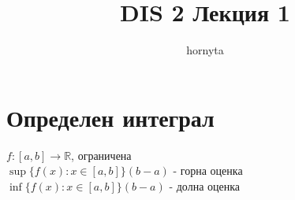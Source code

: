 \documentclass{article}
\author{hornyta}
\title{DIS 2 Лекция 1}
\begin{document}
\maketitle

\section{Определен интеграл}
\begin{figure*}[h!]
    
    

    \(f:[a,b] \to \mathbb{R} \), ограничена \\
    \(\sup\{ f(x) : x \in [a, b] \} (b-a)\) - горна оценка \\
    \(\inf\{ f(x) : x \in [a, b] \} (b-a)\) - долна оценка
    
\end{figure*}
\end{document}
